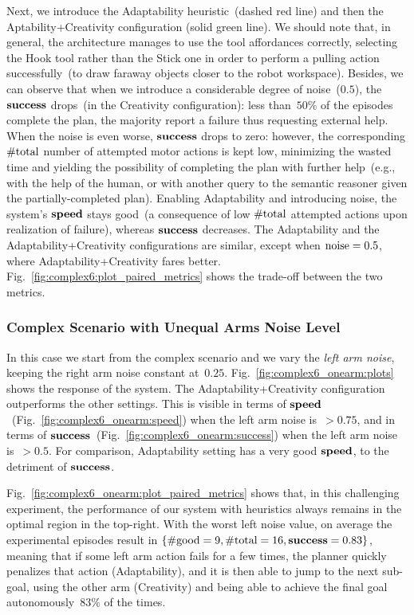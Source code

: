 Next, we introduce the Adaptability heuristic~(dashed red line) and then the Aptability+Creativity configuration (solid green line). We should note that, in general, the architecture manages to use the tool affordances correctly, selecting the Hook tool rather than the Stick one in order to perform a pulling action successfully~(to draw faraway objects closer to the robot workspace).
Besides, we can observe that when we introduce a considerable degree of noise~($0.5$), the $\textbf{\ensuremath{\text{success}}}$ drops~(in the Creativity configuration): less than~$50\%$ of the episodes complete the plan, the majority report a failure thus requesting external help.
When the noise is even worse, $\textbf{\ensuremath{\text{success}}}$ drops to zero: however, the corresponding $\text{\#total}$ number of attempted motor actions is kept low, minimizing the wasted time and yielding the possibility of completing the plan with further help~(e.g., with the help of the human, or with another query to the semantic reasoner given the partially-completed plan).
Enabling Adaptability and introducing noise, the system's $\textbf{\ensuremath{\text{speed}}}$ stays good~(a consequence of low $\text{\#total}$ attempted actions upon realization of failure), whereas $\textbf{\ensuremath{\text{success}}}$ decreases.
The Adaptability and the Adaptability+Creativity configurations are similar, except when $\text{noise} = 0.5$, where Adaptability+Creativity fares better.
Fig.~\ref{fig:complex6:plot_paired_metrics} shows the trade-off between the two metrics.

\subsubsection{Complex Scenario with Unequal Arms Noise Level}
\label{sec:poeticon++:results:quantitative:complex_onearm}

In this case we start from the complex scenario and we vary the \emph{left arm noise}, keeping the right arm noise constant at~$0.25$.
Fig.~\ref{fig:complex6_onearm:plots} shows the response of the system.
The Adaptability+Creativity configuration outperforms the other settings.
This is visible in terms of $\textbf{\ensuremath{\text{speed}}}$~(Fig.~\ref{fig:complex6_onearm:speed}) when the left arm noise is~$> 0.75$, and in terms of $\textbf{\ensuremath{\text{success}}}$~(Fig.~\ref{fig:complex6_onearm:success}) when the left arm noise is~$> 0.5$.
For comparison, Adaptability setting has a very good $\textbf{\ensuremath{\text{speed}}}$, to the detriment of $\textbf{\ensuremath{\text{success}}}$.

Fig.~\ref{fig:complex6_onearm:plot_paired_metrics} shows that, in this challenging experiment, the performance of our system
with heuristics
always remains in the optimal region in the top-right.
With the worst left noise value, on average the experimental episodes result in $\{ \text{\#good}=9, \text{\#total}=16, \textbf{\ensuremath{\text{success}}}=0.83 \}$, meaning that if some left arm action fails for a few times, the planner quickly penalizes that action (Adaptability), and it is then able to jump to the next sub-goal, using the other arm (Creativity) and being able to achieve the final goal autonomously~$83\%$ of the times.

